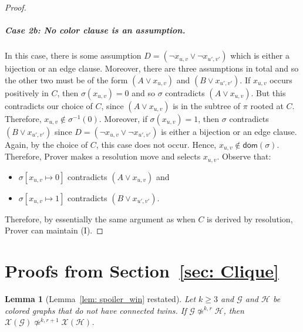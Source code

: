 \documentclass[10pt,a4paper]{article}
\newcommand{\graphG}{\mathcal{G}}
\newcommand{\graphH}{\mathcal{H}}
\newcommand{\dom}{\mathsf{dom}}
\newcommand{\graphXG}{\mathcal{X}(\mathcal{G})}
\newcommand{\graphXH}{\mathcal{X}(\mathcal{H})}
\newcommand{\notkequivr}[2]{\not\simeq^{#1,#2}}
\newtheorem{lemma}[theorem]{Lemma}
\begin{document}
\begin{proof}
\subparagraph{Case 2b: No color clause is an assumption.} In this case, there is some assumption $D= (\neg x_{u,v} \vee \neg x_{u',v'})$ which is either a bijection or an edge clause. Moreover, there are three assumptions in total and so the other two must be of the form $(A \vee x_{u,v})$ and $(B \vee x_{u',v'})$. If $x_{u,v}$ occurs positively in $C$, then $\sigma(x_{u,v}) =0$ and so $\sigma$ contradicts $(A \vee x_{u,v})$. But this contradicts our choice of $C$, since $(A \vee x_{u,v})$ is in the subtree of $\pi$ rooted at $C$. Therefore, $x_{u,v} \not \in \sigma^{-1}(0)$. Moreover, if $\sigma(x_{u,v}) = 1$, then $\sigma$ contradicts $(B \vee x_{u',v'}) $ since $D = (\neg x_{u,v} \vee \neg x_{u',v'})$ is either a bijection or an edge clause. Again, by the choice of $C$, this case does not occur. Hence, $x_{u,v} \not \in \dom(\sigma)$. 
Therefore, Prover makes a resolution move and selects $x_{u,v}$. Observe that:
\begin{itemize}
\item  $\sigma [x_{u,v} \mapsto 0]$ contradicts $(A \vee x_{u,v})$ and
\item $\sigma [x_{u,v} \mapsto 1]$ contradicts $(B \vee x_{u',v'})$.
\end{itemize} 
Therefore, by essentially the same argument as when $C$ is derived by resolution, Prover can maintain (I).
\end{proof} 
\section{Proofs from Section~\ref{sec: Clique} \label{a: duplicator_to_delayer}}

\begin{lemma}[Lemma~\ref{lem: spoiler_win} restated]
Let $k \ge 3$ and $\graphG$ and $\graphH$ be colored graphs that do not have connected twins.
If $\graphG \notkequivr{k}{r} \graphH$, then $\graphXG \notkequivr{k}{r+1} \! \graphXH$. 
\end{lemma}
\end{document}
